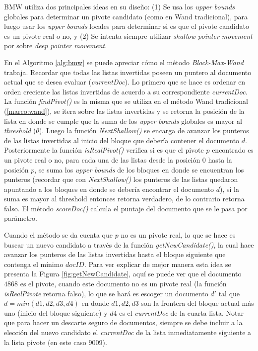 BMW utiliza dos principales ideas en su diseño: (1) Se usa los \textit{upper bounds} globales para determinar un pivote candidato (como en Wand tradicional), para luego usar los \textit{upper bounds} locales para determinar si es que el pivote candidato es un pivote real o no, y (2) Se intenta siempre utilizar \textit{shallow pointer movement} por sobre \textit{deep pointer movement}.

En el Algoritmo \ref{alg:bmw} se puede apreciar cómo el método \textit{Block-Max-Wand} trabaja. Recordar que todas las listas invertidas poseen un puntero al documento actual que se desea evaluar (\textit{currentDoc}). Lo primero que se hace es ordenar en orden creciente las listas invertidas de acuerdo a su correspondiente \textit{currentDoc}. La función \textit{findPivot()} es la misma que se utiliza en el método Wand tradicional (\ref{marco:wand}), se itera sobre las listas invertidas y se retorna la posición de la lista en donde se cumple que la suma de los \textit{upper bounds} globales es mayor al \textit{threshold} ($\theta$). Luego la función \textit{NextShallow()} se encarga de avanzar los punteros de las listas invertidas al inicio del bloque que debería contener el documento $d$. Posteriormente la función \textit{isRealPivot()} verifica si es que el pivote $p$ encontrado es un pivote real o no, para cada una de las listas desde la posición $0$ hasta la posición $p$, se suma los \textit{upper bounds} de los bloques en donde se encuentran los punteros (recordar que con \textit{NextShallow()} los punteros de las listas quedaron apuntando a los bloques en donde se debería encontrar el documento $d$), si la suma es mayor al threshold entonces retorna verdadero, de lo contrario retorna falso. El método \textit{scoreDoc()} calcula el puntaje del documento que se le pasa por parámetro. 

Cuando el método se da cuenta que $p$ no es un pivote real, lo que se hace es buscar un nuevo candidato a través de la función \textit{getNewCandidate()}, la cual hace avanzar los punteros de las listas invertidas hasta el bloque siguiente que contenga el mínimo $docID$. Para ver explicar de mejor manera esta idea se presenta la Figura \ref{fig:getNewCandidate}, aquí se puede ver que el documento $4868$ es el pivote, cuando este documento no es un pivote real (la función \textit{isRealPivote} retorna falso), lo que se hará es escoger un documento $d'$ tal que $d = min(d1,d2,d3,d4)$ en donde $d1,d2,d3$ son la frontera del bloque actual más uno (inicio del bloque siguiente) y $d4$ es el \textit{currentDoc} de la cuarta lista. Notar que para hacer un descarte seguro de documentos, siempre se debe incluir a la elección del nuevo candidato el \textit{currentDoc} de la lista inmediatamente siguiente a la lista pivote (en este caso 9009).  


